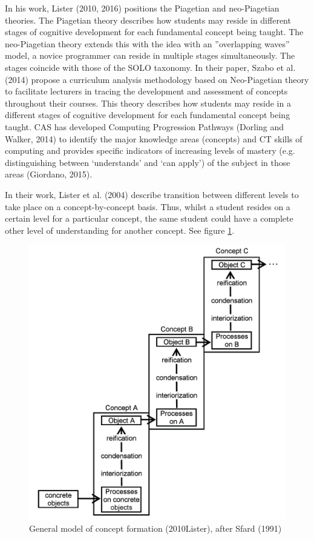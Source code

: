 In his work, Lister (2010, 2016) positions the Piagetian and neo-Piagetian theories. The Piagetian theory describes how students may reside in different stages of cognitive development for each fundamental concept being taught. The neo-Piagetian theory extends this with the idea with an ”overlapping waves” model, a novice programmer can reside in multiple stages simultaneously. The stages coincide with those of the SOLO taxonomy. In their paper, Szabo et al. (2014) propose a curriculum analysis methodology based on Neo-Piagetian theory to facilitate lecturers in tracing the development and assessment of concepts throughout their courses. This theory describes how students may reside in a different stages of cognitive development for each fundamental concept being taught. CAS has developed Computing Progression Pathways (Dorling and Walker, 2014) to identify the major knowledge areas (concepts) and CT skills of computing and provides specific indicators of increasing levels of mastery (e.g. distinguishing between ‘understands’ and ‘can apply’) of the subject in those areas (Giordano, 2015). 


In their work, Lister et al. (2004) describe transition between different levels to take place on a concept-by-concept basis. Thus, whilst a student resides on a certain level for a particular concept, the same student could have a complete other level of understanding for another concept. See figure \ref{fig:ListerFases}.



\begin{figure}\label{fig:ListerFases}
\includegraphics[scale=0.8]{figures/ListerFases.png}
\caption{General model of concept formation (2010Lister), after Sfard (1991)}
\end{figure}

